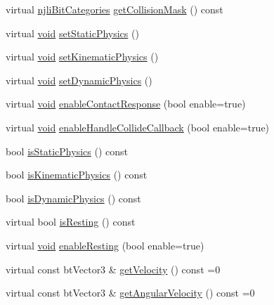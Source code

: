 \begin{DoxyCompactItemize}
\item 
virtual \mbox{\hyperlink{namespacenjli_af7b302a2b48bb644f85c88080925c974}{njli\+Bit\+Categories}} \mbox{\hyperlink{classnjli_1_1_physics_body_a650d1076cacf8ba50ddbb19691c01324}{get\+Collision\+Mask}} () const
\item 
virtual \mbox{\hyperlink{_thread_8h_af1e856da2e658414cb2456cb6f7ebc66}{void}} \mbox{\hyperlink{classnjli_1_1_physics_body_a4c323ff21d529c581207eca237d93fa3}{set\+Static\+Physics}} ()
\item 
virtual \mbox{\hyperlink{_thread_8h_af1e856da2e658414cb2456cb6f7ebc66}{void}} \mbox{\hyperlink{classnjli_1_1_physics_body_ab7747d6463f3bc09b0834f51b3e0d3ee}{set\+Kinematic\+Physics}} ()
\item 
virtual \mbox{\hyperlink{_thread_8h_af1e856da2e658414cb2456cb6f7ebc66}{void}} \mbox{\hyperlink{classnjli_1_1_physics_body_a507e920a3e95896173545a631325f52a}{set\+Dynamic\+Physics}} ()
\item 
virtual \mbox{\hyperlink{_thread_8h_af1e856da2e658414cb2456cb6f7ebc66}{void}} \mbox{\hyperlink{classnjli_1_1_physics_body_a445e356d3e6757c2d629e307c3579e01}{enable\+Contact\+Response}} (bool enable=true)
\item 
virtual \mbox{\hyperlink{_thread_8h_af1e856da2e658414cb2456cb6f7ebc66}{void}} \mbox{\hyperlink{classnjli_1_1_physics_body_a52eca1531519fbd9a3612e36fd797208}{enable\+Handle\+Collide\+Callback}} (bool enable=true)
\item 
bool \mbox{\hyperlink{classnjli_1_1_physics_body_a9371ebdae5ef5e8de3ac5d132a98811e}{is\+Static\+Physics}} () const
\item 
bool \mbox{\hyperlink{classnjli_1_1_physics_body_a00c42708cf7cebd2c287b6caae77b589}{is\+Kinematic\+Physics}} () const
\item 
bool \mbox{\hyperlink{classnjli_1_1_physics_body_a37afd50adbf592ba17ff2b4cd45b5311}{is\+Dynamic\+Physics}} () const
\item 
virtual bool \mbox{\hyperlink{classnjli_1_1_physics_body_a5aeab5201a9d85013340b2a1fb8af7e3}{is\+Resting}} () const
\item 
virtual \mbox{\hyperlink{_thread_8h_af1e856da2e658414cb2456cb6f7ebc66}{void}} \mbox{\hyperlink{classnjli_1_1_physics_body_a03e2635ad02016962cee7df3019e73eb}{enable\+Resting}} (bool enable=true)
\item 
virtual const bt\+Vector3 \& \mbox{\hyperlink{classnjli_1_1_physics_body_add437a6d229dfbf74a838d0de7229867}{get\+Velocity}} () const =0
\item 
virtual const bt\+Vector3 \& \mbox{\hyperlink{classnjli_1_1_physics_body_a598de298accae3b59c821ab8e640d464}{get\+Angular\+Velocity}} () const =0

\end{DoxyCompactItemize}
